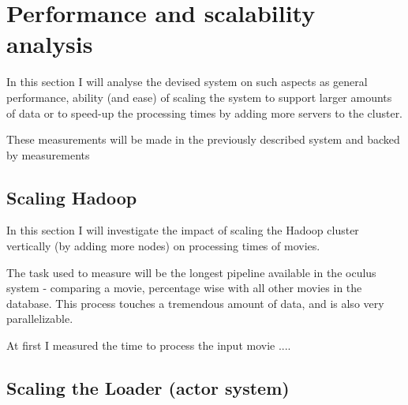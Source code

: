 \chapter{Performance and scalability analysis}
\label{chap:perf-scalability}

In this section I will analyse the devised system on such aspects as general performance, ability (and ease) of scaling the system
to support larger amounts of data or to speed-up the processing times by adding more servers to the cluster.

These measurements will be made in the previously described system and backed by measurements 

\section{Scaling Hadoop}
In this section I will investigate the impact of scaling the Hadoop cluster vertically (by adding more nodes) on processing times of movies.

The task used to measure will be the longest pipeline available in the oculus system - comparing a movie, percentage wise with all other movies in the database.
This process touches a tremendous amount of data, and is also very parallelizable.

At first I measured the time to process the input movie ....

\section{Scaling the Loader (actor system)}
